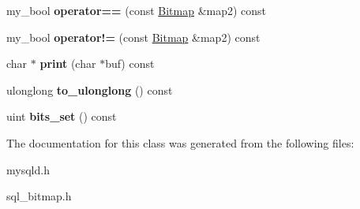 \begin{DoxyCompactItemize}
\item 
\mbox{\label{classBitmap_acdd6cd31e594729a54d0e2b869d2264c}} 
my\+\_\+bool {\bfseries operator==} (const \mbox{\hyperlink{classBitmap}{Bitmap}} \&map2) const
\item 
\mbox{\label{classBitmap_a458d99b4e573b1f180a9da3829559887}} 
my\+\_\+bool {\bfseries operator!=} (const \mbox{\hyperlink{classBitmap}{Bitmap}} \&map2) const
\item 
\mbox{\label{classBitmap_a68d8355835095d012dc6fdef0844d9dc}} 
char $\ast$ {\bfseries print} (char $\ast$buf) const
\item 
\mbox{\label{classBitmap_a589df07dd016fe3bec7607fb99dbf6d4}} 
ulonglong {\bfseries to\+\_\+ulonglong} () const
\item 
\mbox{\label{classBitmap_aefc11cac7c014198d28734045ce1e382}} 
uint {\bfseries bits\+\_\+set} () const
\end{DoxyCompactItemize}


The documentation for this class was generated from the following files\+:\begin{DoxyCompactItemize}
\item 
mysqld.\+h\item 
sql\+\_\+bitmap.\+h\end{DoxyCompactItemize}
